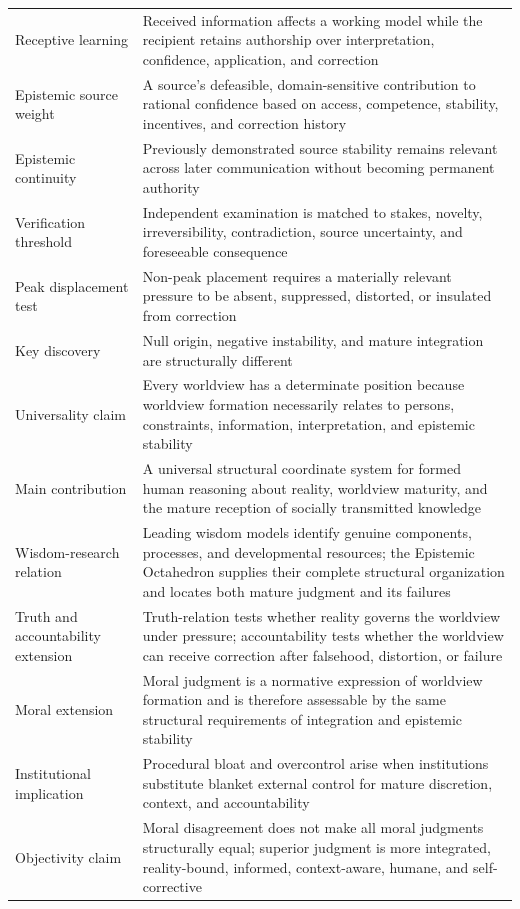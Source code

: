 \documentclass[11pt]{article}
\begin{document}
\begin{longtable}{>{\raggedright\arraybackslash}p{3.0cm} >{\raggedright\arraybackslash}p{10.5cm}}
Receptive learning & Received information affects a working model while the recipient retains authorship over interpretation, confidence, application, and correction \\
Epistemic source weight & A source's defeasible, domain-sensitive contribution to rational confidence based on access, competence, stability, incentives, and correction history \\
Epistemic continuity & Previously demonstrated source stability remains relevant across later communication without becoming permanent authority \\
Verification threshold & Independent examination is matched to stakes, novelty, irreversibility, contradiction, source uncertainty, and foreseeable consequence \\
Peak displacement test & Non-peak placement requires a materially relevant pressure to be absent, suppressed, distorted, or insulated from correction \\
Key discovery & Null origin, negative instability, and mature integration are structurally different \\
Universality claim & Every worldview has a determinate position because worldview formation necessarily relates to persons, constraints, information, interpretation, and epistemic stability \\
Main contribution & A universal structural coordinate system for formed human reasoning about reality, worldview maturity, and the mature reception of socially transmitted knowledge \\
Wisdom-research relation & Leading wisdom models identify genuine components, processes, and developmental resources; the Epistemic Octahedron supplies their complete structural organization and locates both mature judgment and its failures \\ 
Truth and accountability extension & Truth-relation tests whether reality governs the worldview under pressure; accountability tests whether the worldview can receive correction after falsehood, distortion, or failure \\
Moral extension & Moral judgment is a normative expression of worldview formation and is therefore assessable by the same structural requirements of integration and epistemic stability \\
Institutional implication & Procedural bloat and overcontrol arise when institutions substitute blanket external control for mature discretion, context, and accountability \\
Objectivity claim & Moral disagreement does not make all moral judgments structurally equal; superior judgment is more integrated, reality-bound, informed, context-aware, humane, and self-corrective \\
\bottomrule
\end{longtable}
\end{document}
